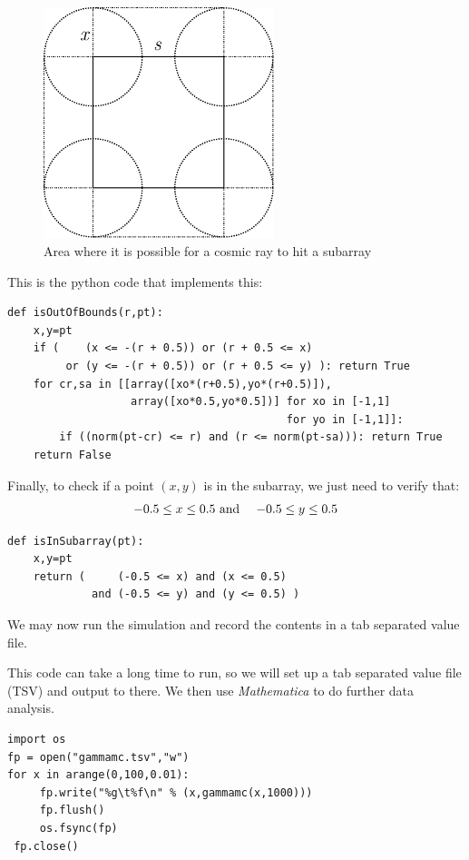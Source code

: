 \documentclass[a4paper,12pt,final]{article}
\begin{document}
\begin{figure}[hb]
\centering
    \includegraphics[width=0.6\textwidth]{drawing.pdf}
\caption{Area where it is possible for a cosmic ray to hit a subarray}\label{drawing1}
\end{figure}
\pagebreak
This is the python code that implements this:

\begin{verbatim}
def isOutOfBounds(r,pt):
    x,y=pt
    if (    (x <= -(r + 0.5)) or (r + 0.5 <= x)
         or (y <= -(r + 0.5)) or (r + 0.5 <= y) ): return True
    for cr,sa in [[array([xo*(r+0.5),yo*(r+0.5)]),
                   array([xo*0.5,yo*0.5])] for xo in [-1,1] 
                                           for yo in [-1,1]]:
        if ((norm(pt-cr) <= r) and (r <= norm(pt-sa))): return True
    return False

\end{verbatim}

 
Finally, to check if a point $(x,y)$ is in the subarray, we just need
to verify that:
\begin{eqnarray*}
-0.5 \leq x \leq 0.5 & \textup{ and } & -0.5 \leq y \leq 0.5
\end{eqnarray*}

\begin{verbatim}
def isInSubarray(pt):
    x,y=pt
    return (     (-0.5 <= x) and (x <= 0.5) 
             and (-0.5 <= y) and (y <= 0.5) )

\end{verbatim}

 
We may now run the simulation and record the contents in a tab
separated value file.

This code can take a long time to run, so we will set up a tab
separated value file (TSV) and output to there.  We then use
\emph{Mathematica} to do further data analysis.

\begin{verbatim}
import os
fp = open("gammamc.tsv","w")
for x in arange(0,100,0.01): 
     fp.write("%g\t%f\n" % (x,gammamc(x,1000)))
     fp.flush()
     os.fsync(fp)
 fp.close()
\end{verbatim}

 
\end{document}
